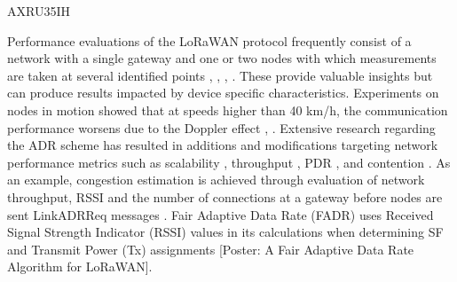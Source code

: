 \cite{marais_evaluating_2019} AXRU35IH

Performance evaluations of the LoRaWAN protocol frequently consist of a network with a single gateway and one or two nodes with which measurements are taken at several identified points \cite{marais_lora_2017},
	\cite{aref_free_2014},
	\cite{petajajarvi_coverage_2015},
	\cite{augustin_study_2016}.
These provide valuable insights but can produce results impacted by device specific characteristics.
Experiments on nodes in motion showed that at speeds higher than 40 km/h,
	the communication performance worsens due to the Doppler effect \cite{petajajarvi_performance_2017},
	\cite{sanchez-iborra_performance_2018}.
Extensive research regarding the ADR scheme has resulted in additions and modifications targeting network performance metrics such as scalability \cite{kim_adaptive_2017},
	throughput \cite{cuomo_explora_2017},
	PDR \cite{reynders_power_2017},
	and contention \cite{kim_contention-aware_2018}.
As an example,
	congestion estimation is achieved through evaluation of network throughput,
	RSSI and the number of connections at a gateway before nodes are sent LinkADRReq messages \cite{kim_adaptive_2017}.
Fair Adaptive Data Rate (FADR) uses Received Signal Strength Indicator (RSSI) values in its calculations when determining SF and Transmit Power (Tx) assignments [Poster:
	A Fair Adaptive Data Rate Algorithm for LoRaWAN].



